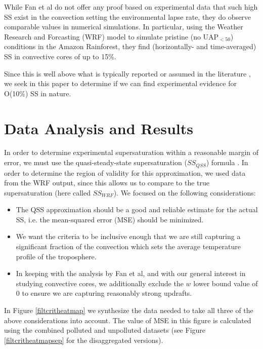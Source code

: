 \documentclass{article}
\begin{document}
While Fan et al do not offer any proof based on experimental data that such high SS exist in the convection setting the environmental lapse rate, they do observe comparable values in numerical simulations. In particular, using the Weather Research and Forcasting (WRF) model to simulate pristine (no UAP$_{<50}$) conditions in the Amazon Rainforest, they find (horizontally- and time-averaged) SS in convective cores of up to 15\%.

Since this is well above what is typically reported or assumed in the literature \cite{Hoppel1996, Yang2019, Koike2012, Politovich1988, Moteki2019, Siebert2017, Shen2018, Hammer2014, Li2019}, we seek in this paper to determine if we can find experimental evidence for O(10\%) SS in nature.

\section{Data Analysis and Results}

In order to determine experimental supersaturation within a reasonable margin of error, we must use the quasi-steady-state supersaturation ($SS_{QSS}$) formula \cite{Rogers1989}. In order to determine the region of validity for this approximation, we used data from the WRF output, since this allows us to compare to the true supersaturation (here called $SS_{WRF}$). We focused on the following considerations:
\begin{itemize}
\item The QSS approximation should be a good and reliable estimate for the actual SS, i.e. the mean-squared error (MSE) should be minimized.  
\item We want the criteria to be inclusive enough that we are still capturing a significant fraction of the convection which sets the average temperature profile of the troposphere.
\item In keeping with the analysis by Fan et al, and with our general interest in studying convective cores, we additionally exclude the $w$ lower bound value of 0 to ensure we are capturing reasonably strong updrafts. 
\end{itemize}
In Figure \ref{filtcritheatmap} we synthesize the data needed to take all three of the above considerations into account. The value of MSE in this figure is calculated using the combined polluted and unpolluted datasets (see Figure \ref{filtcritheatmapsep} for the disaggregated versions). 
\end{document}
